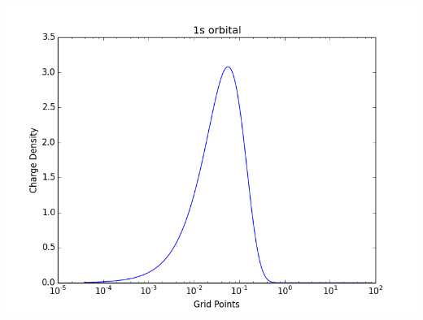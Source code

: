 \documentclass[11pt]{article}
\begin{document}
\includegraphics[width=.9\linewidth]{./images/Ar-1s-charge-density.png}
\end{document}
